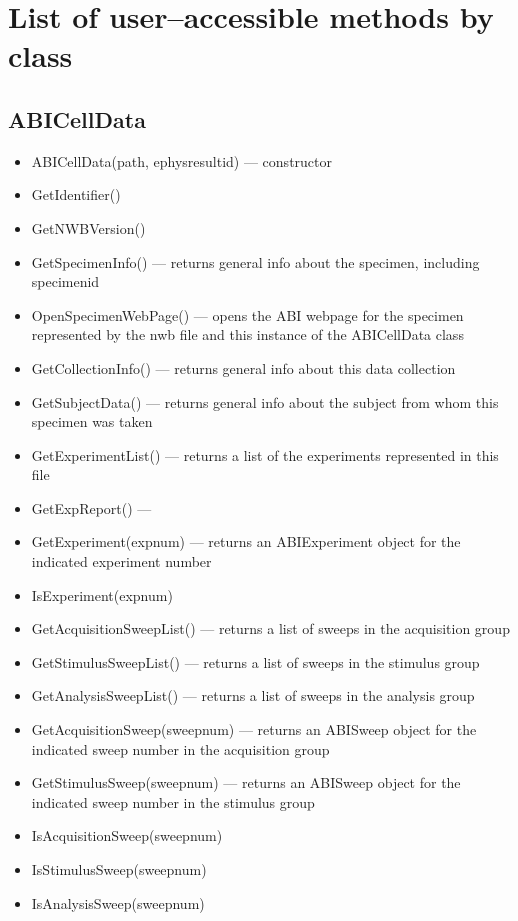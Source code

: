 \documentclass{article}
\begin{document}
\section{List of user--accessible methods by class}
\subsection{ABICellData}
\begin{itemize}
	\item ABICellData(path, ephysresultid) --- constructor
	\item GetIdentifier()
	\item GetNWBVersion()
	\item GetSpecimenInfo() --- returns general info about the specimen, including specimenid
	\item OpenSpecimenWebPage() --- opens the ABI webpage for the specimen represented by the nwb file and this instance of the ABICellData class
	\item GetCollectionInfo() --- returns general info about this data collection
	\item GetSubjectData() --- returns general info about the subject from whom this specimen was taken 
	\item GetExperimentList() --- returns a list of the experiments represented in this file
	\item GetExpReport() --- 
	\item GetExperiment(expnum) --- returns an ABIExperiment object for the indicated experiment number 
	\item IsExperiment(expnum)
	\item GetAcquisitionSweepList() --- returns a list of sweeps in the acquisition group
	\item GetStimulusSweepList() --- returns a list of sweeps in the stimulus group
	\item GetAnalysisSweepList() --- returns a list of sweeps in the analysis group
	\item GetAcquisitionSweep(sweepnum) --- returns an ABISweep object for the indicated sweep number in the acquisition group
	\item GetStimulusSweep(sweepnum) --- returns an ABISweep object for the indicated sweep number in the stimulus group
	\item IsAcquisitionSweep(sweepnum)
	\item IsStimulusSweep(sweepnum)
	\item IsAnalysisSweep(sweepnum)
\end{itemize}
\end{document}
